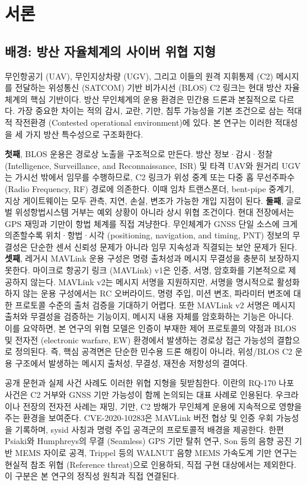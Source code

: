 \section{서론}

\subsection{배경: 방산 자율체계의 사이버 위협 지형}

무인항공기 (UAV), 무인지상차량 (UGV), 그리고 이들의 원격 지휘통제 (C2) 메시지를 전달하는 위성통신 (SATCOM) 기반 비가시선 (BLOS) C2 링크는 현대 방산 자율체계의 핵심 기반이다. 
%
방산 무인체계의 운용 환경은 민간용 드론과 본질적으로 다르다. 
%
가장 중요한 차이는 적의 감시, 교란, 기만, 침투 가능성을 기본 조건으로 삼는 적대적 작전환경 (Contested operational environment)에 있다. 본 연구는 이러한 적대성을 세 가지 방산 특수성으로 구조화한다.

\textbf{첫째}, BLOS 운용은 경로상 노출을 구조적으로 만든다. 
%
방산 정보·감시·정찰 (Intelligence, Surveillance, and Reconnaissance, ISR) 및 타격 UAV와 원거리 UGV는 가시선 밖에서 임무를 수행하므로, C2 링크가 위성 중계 또는 다중 홉 무선주파수 (Radio Frequency, RF) 경로에 의존한다. 이때 임차 트랜스폰더, bent-pipe 중계기, 지상 게이트웨이는 모두 관측, 지연, 손실, 변조가 가능한 개입 지점이 된다.
%
\textbf{둘째}, 글로벌 위성항법시스템 거부는 예외 상황이 아니라 상시 위협 조건이다. 현대 전장에서는 GPS 재밍과 기만이 항법 체계를 직접 겨냥한다. 
%
무인체계가 GNSS 단일 소스에 크게 의존할수록 위치·항법·시각 (positioning, navigation, and timing, PNT) 정보의 무결성은 단순한 센서 신뢰성 문제가 아니라 임무 지속성과 직결되는 보안 문제가 된다.
%
\textbf{셋째}, 레거시 MAVLink 운용 구성은 명령 출처성과 메시지 무결성을 충분히 보장하지 못한다. 
%
마이크로 항공기 링크 (MAVLink) v1은 인증, 서명, 암호화를 기본적으로 제공하지 않는다. MAVLink v2는 메시지 서명을 지원하지만, 서명을 명시적으로 활성화하지 않는 운용 구성에서는 RC 오버라이드, 명령 주입, 미션 변조, 파라미터 변조에 대한 프로토콜 수준의 출처 검증을 기대하기 어렵다. 또한 MAVLink v2 서명은 메시지 출처와 무결성을 검증하는 기능이지, 메시지 내용 자체를 암호화하는 기능은 아니다.
%
이를 요약하면, 본 연구의 위협 모델은 인증이 부재한 제어 프로토콜의 약점과 BLOS 및 전자전 (electronic warfare, EW) 환경에서 발생하는 경로상 접근 가능성의 결합으로 정의된다. 즉, 핵심 공격면은 단순한 민수용 드론 해킹이 아니라, 위성/BLOS C2 운용 구조에서 발생하는 메시지 출처성, 무결성, 재전송 저항성의 결여다.

공개 문헌과 실제 사건 사례도 이러한 위협 지형을 뒷받침한다. 이란의 RQ-170 나포 사건은 C2 거부와 GNSS 기만 가능성이 함께 논의되는 대표 사례로 인용된다\cite{humphreys_testimony_2012}. 우크라이나 전장의 전자전 사례는 재밍, 기만, C2 방해가 무인체계 운용에 지속적으로 영향을 주는 환경을 보여준다\cite{rusi_russian_airwar_2022}. CVE-2020-10283은 MAVLink 버전 협상 및 인증 우회 가능성을 기록하며, sysid 사칭과 명령 주입 공격군의 프로토콜적 배경을 제공한다\cite{cve202010283}. 한편 Psiaki와 Humphreys의 무결 (Seamless) GPS 기만 탈취 연구\cite{psiaki_humphreys_2016}, Son 등의 음향 공진 기반 MEMS 자이로 공격\cite{son2015rocking}, Trippel 등의 WALNUT 음향 MEMS 가속도계 기만 연구\cite{trippel2017walnut}는 현실적 참조 위협 (Reference threat)으로 인용하되, 직접 구현 대상에서는 제외한다. 이 구분은 본 연구의 정직성 원칙과 직접 연결된다.


